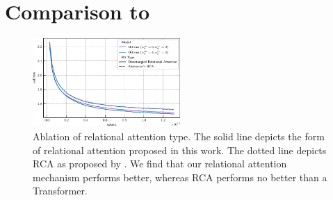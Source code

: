 \section{Comparison to~\citet{altabaa2024abstractors}}




\begin{figure}[h]
    \centering
    \includegraphics[width=0.5\textwidth]{figs/experiments/tiny_stories/d64L4_ra_type_ablation_symattn_asymra.pdf}
    \caption{Ablation of relational attention type. The solid line depicts the form of relational attention proposed in this work. The dotted line depicts RCA as proposed by \citet{altabaa2024abstractors}. We find that our relational attention mechanism performs better, whereas RCA performs no better than a Transformer.}
\end{figure}